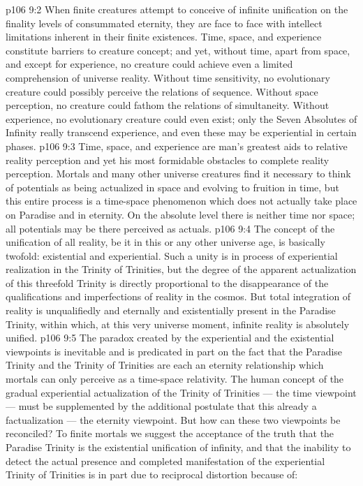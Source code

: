 \vs p106 9:2 When finite creatures attempt to conceive of infinite unification on the finality levels of consummated eternity, they are face to face with intellect limitations inherent in their finite existences. Time, space, and experience constitute barriers to creature concept; and yet, without time, apart from space, and except for experience, no creature could achieve even a limited comprehension of universe reality. Without time sensitivity, no evolutionary creature could possibly perceive the relations of sequence. Without space perception, no creature could fathom the relations of simultaneity. Without experience, no evolutionary creature could even exist; only the Seven Absolutes of Infinity really transcend experience, and even these may be experiential in certain phases.
\vs p106 9:3 Time, space, and experience are man’s greatest aids to relative reality perception and yet his most formidable obstacles to complete reality perception. Mortals and many other universe creatures find it necessary to think of potentials as being actualized in space and evolving to fruition in time, but this entire process is a time\hyp{}space phenomenon which does not actually take place on Paradise and in eternity. On the absolute level there is neither time nor space; all potentials may be there perceived as actuals.
\vs p106 9:4 The concept of the unification of all reality, be it in this or any other universe age, is basically twofold: existential and experiential. Such a unity is in process of experiential realization in the Trinity of Trinities, but the degree of the apparent actualization of this threefold Trinity is directly proportional to the disappearance of the qualifications and imperfections of reality in the cosmos. But total integration of reality is unqualifiedly and eternally and existentially present in the Paradise Trinity, within which, at this very universe moment, infinite reality is absolutely unified.
\vs p106 9:5 \pc The paradox created by the experiential and the existential viewpoints is inevitable and is predicated in part on the fact that the Paradise Trinity and the Trinity of Trinities are each an eternity relationship which mortals can only perceive as a time\hyp{}space relativity. The human concept of the gradual experiential actualization of the Trinity of Trinities --- the time viewpoint --- must be supplemented by the additional postulate that this  already a factualization --- the eternity viewpoint. But how can these two viewpoints be reconciled? To finite mortals we suggest the acceptance of the truth that the Paradise Trinity is the existential unification of infinity, and that the inability to detect the actual presence and completed manifestation of the experiential Trinity of Trinities is in part due to reciprocal distortion because of:
